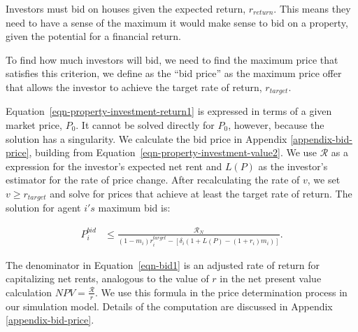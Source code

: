 Investors must bid on houses given the expected return, $r_{return}$. This means they need to have a sense of the maximum it would make sense to bid on a property, given the potential for a financial return.


To find how much investors will bid, we need to find the maximum price that satisfies this criterion, we define as the ``bid price'' %
as the maximum price offer that allows the investor to achieve the target rate of return, $r_{target}$.   %

Equation~\ref{eqn-property-investment-return1} is expressed in terms of a given market price, $P_0$. It cannot be solved directly for $P_0$, however, because the solution has a singularity.
We calculate the bid price in Appendix \ref{appendix-bid-price}, building from Equation~\ref{eqn-property-investment-value2}. We use $\mathcal{R}$ as a expression for the investor's expected net rent and $L(P)$ as the investor's  estimator for the rate of price change. After recalculating the rate of $v$, we set $v \ge r_{target}$ and solve for prices that achieve at least the target rate of return. The solution for agent $i's$ maximum bid is: 

\begin{align}
P_i^{bid} & \le   \frac{ \mathcal{R}_N}{(1-m_i)r_i^{target}-\left[ \delta_i(1+L(P)- (1+ r_i)m_i)\right]}.
\label{eqn-bid1}
\end{align}

The denominator in Equation~\ref{eqn-bid1} is an adjusted rate of return for capitalizing net rents, analogous to the value of $r$ in the net present value calculation $NPV=\frac{\mathcal{R}}{r}$. 
We use this formula in the price determination process in our simulation model. Details of the computation are discussed in Appendix \ref{appendix-bid-price}. 



